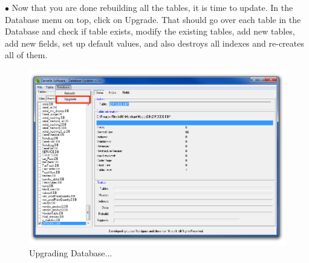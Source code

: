 \documentclass[a4paper, 11pt]{article}
\begin{document}
\pagebreak

\vspace*{\fill}
$\bullet$ Now that you are done rebuilding all the tables, it is time to update. In the Database menu on top, click on Upgrade. That should go over each table in the Database and check if table exists, modify the existing tables, add new tables, add new fields, set up default values, and also destroys all indexes and re-creates all of them. 
\begin{figure}[h]
    \centering
     \includegraphics[width=\textwidth]{capture 29}
    \caption{Upgrading Database...}
\end{figure}
\vspace*{\fill}

\pagebreak
\end{document}
